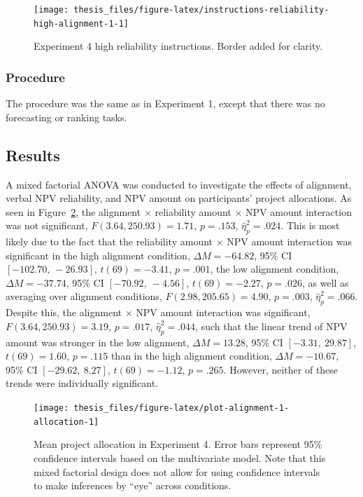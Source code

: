 \documentclass[a4paper, nobind, dvipsnames]{templates/ociamthesis}
\theoremstyle{definition}
\theoremstyle{definition}
\theoremstyle{definition}
\theoremstyle{definition}
\theoremstyle{remark}
\begin{document}
\begin{figure}
\texttt{[image: thesis\_files/figure-latex/instructions-reliability-high-alignment-1-1]} \caption{Experiment 4 high reliability instructions. Border added for clarity.}\label{fig:instructions-reliability-high-alignment-1}
\end{figure}

\hypertarget{procedure-8}{%
\subsubsection{Procedure}\label{procedure-8}}

The procedure was the same as in Experiment 1, except that there was no
forecasting or ranking tasks.

\hypertarget{results-alignment-1}{%
\subsection{Results}\label{results-alignment-1}}

A mixed factorial ANOVA was conducted to investigate the effects of alignment,
verbal NPV reliability, and NPV amount on participants' project allocations. As
seen in Figure~\ref{fig:plot-alignment-1-allocation}, the alignment \(\times\)
reliability amount \(\times\) NPV amount interaction was not significant,
\(F(3.64, 250.93) = 1.71\), \(p = .153\), \(\hat{\eta}^2_p = .024\). This
is most likely due to the fact that the reliability amount \(\times\) NPV amount
interaction was significant in the high alignment condition,
\(\Delta M = -64.82\), 95\% CI \([-102.70,~-26.93]\), \(t(69) = -3.41\), \(p = .001\), the low alignment
condition, \(\Delta M = -37.74\), 95\% CI \([-70.92,~-4.56]\), \(t(69) = -2.27\), \(p = .026\), as well as
averaging over alignment conditions,
\(F(2.98, 205.65) = 4.90\), \(p = .003\), \(\hat{\eta}^2_p = .066\). Despite this,
the alignment \(\times\) NPV amount interaction was significant,
\(F(3.64, 250.93) = 3.19\), \(p = .017\), \(\hat{\eta}^2_p = .044\), such that the linear
trend of NPV amount was stronger in the low alignment,
\(\Delta M = 13.28\), 95\% CI \([-3.31,~29.87]\), \(t(69) = 1.60\), \(p = .115\) than in the high alignment
condition, \(\Delta M = -10.67\), 95\% CI \([-29.62,~8.27]\), \(t(69) = -1.12\), \(p = .265\). However, neither of
these trends were individually significant.



\begin{figure}
\texttt{[image: thesis\_files/figure-latex/plot-alignment-1-allocation-1]} \caption{Mean project allocation in Experiment 4. Error bars represent 95\% confidence intervals based on the multivariate model. Note that this mixed factorial design does not allow for using confidence intervals to make inferences by ``eye'' across conditions.}\label{fig:plot-alignment-1-allocation}
\end{figure}
\end{document}

